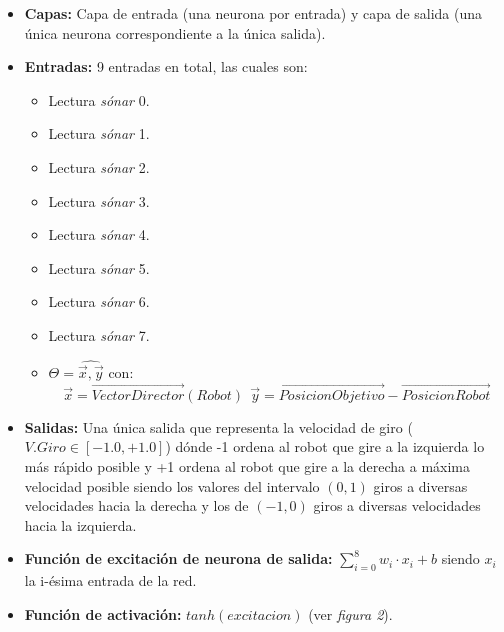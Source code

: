 \documentclass[12pt,spanish]{article}
\begin{document}
\begin{itemize}
	\item{\textbf{Capas: }} Capa de entrada (una neurona por entrada) y capa de salida (una única neurona correspondiente a la única salida).
	\item{\textbf{Entradas:} } 9 entradas en total, las cuales son:
		\begin{itemize}
			\item Lectura \textit{sónar} 0.
			\item Lectura \textit{sónar} 1.
			\item Lectura \textit{sónar} 2.
			\item Lectura \textit{sónar} 3.
			\item Lectura \textit{sónar} 4.
			\item Lectura \textit{sónar} 5.
			\item Lectura \textit{sónar} 6.
			\item Lectura \textit{sónar} 7.
			\item $\Theta = \hat{\vec{x},\vec{y}}$ con: $$ \vec{x} = \vec{VectorDirector}(Robot) ~~ \vec{y} = \vec{PosicionObjetivo}-\vec{PosicionRobot}$$
		\end{itemize}
	\item{\textbf{Salidas: }} Una única salida que representa la velocidad de giro ($V.Giro \in [-1.0, +1.0]$) dónde -1 ordena al robot que gire a la izquierda lo más rápido posible y +1 ordena al robot que gire a la derecha a máxima velocidad posible siendo los valores del intervalo $(0,1)$ giros a diversas velocidades hacia la derecha y los de $(-1,0)$ giros a diversas velocidades hacia la izquierda.
	\item{\textbf{Función de excitación de neurona de salida:} } $\sum_{i = 0}^{8}w_{i}\cdot x_{i}+b$ siendo $x_{i}$ la i-ésima entrada de la red.
	\item{\textbf{Función de activación:} } $tanh(excitacion)$ (ver \textit{figura 2}).
	\begin{figure}[!ht]
		\begin{center}

\end{center}
\end{figure}
\end{itemize}
\end{document}
